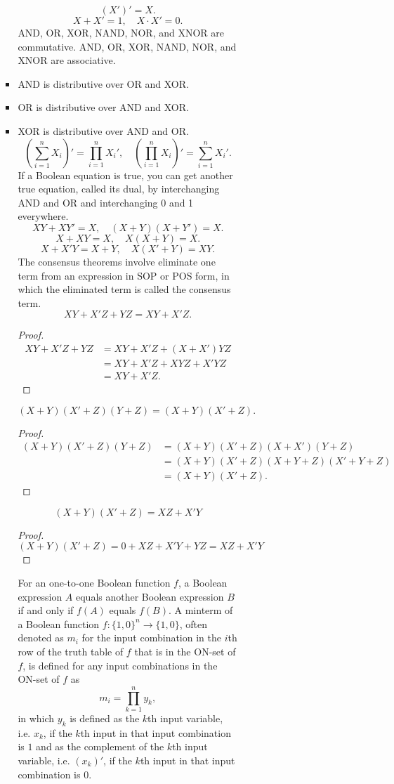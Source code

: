 \documentclass[a4paper,12pt]{report}
\begin{document}
\begin{itemize}
\begin{itemize}
\begin{itemize}
\begin{itemize}
\begin{itemize}
\begin{itemize}
\begin{itemize}
\begin{itemize}
\[(X′)′ = X.\]
\[X + X′ = 1 ,\quad X\cdot X′ = 0 .\]
AND, OR, XOR, NAND, NOR, and XNOR are commutative.
AND, OR, XOR, NAND, NOR, and XNOR are associative.
\bit
\item AND is distributive over OR and XOR.
\item OR is distributive over AND and XOR.
\item XOR is distributive over AND and OR.
\eit
{}
\[(\sum_{i=1}^nX_i)′=\prod_{i=1}^nX_i',\quad (\prod_{i=1}^nX_i)'=\sum_{i=1}^nX_i'.\]
If a Boolean equation is true, you can get another true equation, called its dual, by interchanging AND and OR and interchanging 0 and 1 everywhere.
\[XY+XY'=X,\quad (X+Y)(X+Y')=X.\]
\[X+XY=X,\quad X(X+Y)=X.\]
\[X+X'Y=X+Y,\quad X(X'+Y)=XY.\]
The consensus theorems involve eliminate one term from an expression in SOP or POS form, in which the eliminated term is called the consensus term.
\[XY+X′Z+YZ=XY+X′Z.\]
\begin{proof}
\[\begin{aligned}
XY+X′Z+YZ&=XY+X'Z+(X+X')YZ\\
&=XY+X'Z+XYZ+X'YZ\\
&=XY+X′Z.
\end{aligned}\]
\end{proof}
\[(X+Y)(X′+Z)(Y+Z)=(X+Y)(X′+Z).\]
\begin{proof}
\[\begin{aligned}
(X+Y)(X′+Z)(Y+Z)&=(X+Y)(X'+Z)(X+X')(Y+Z)\\
&=(X+Y)(X'+Z)(X+Y+Z)(X'+Y+Z)\\
&=(X+Y)(X′+Z).
\end{aligned}\]
\end{proof}
\[(X+Y)(X'+Z)=XZ+X'Y\]
\begin{proof}
\[(X+Y)(X'+Z)=0+XZ+X'Y+YZ=XZ+X'Y\]
\end{proof}
For an one-to-one Boolean function $f$, a Boolean expression $A$ equals another Boolean expression $B$ if and only if $f(A)$ equals $f(B)$.
A minterm of a Boolean function $f\colon\{1,0\}^n\to\{1,0\}$, often denoted as $m_i$ for the input combination in the $i$th row of the truth table of $f$ that is in the ON-set of $f$, is defined for any input combinations in the ON-set of $f$ as
\[m_i=\prod_{k=1}^ny_k,\]
in which $y_k$ is defined as the $k$th input variable, i.e. $x_k$, if the $k$th input in that input combination is $1$ and as the complement of the $k$th input variable, i.e. $(x_k)'$, if the $k$th input in that input combination is $0$.


\end{itemize}
\end{itemize}
\end{itemize}
\end{itemize}
\end{itemize}
\end{itemize}
\end{itemize}
\end{itemize}
\end{document}
